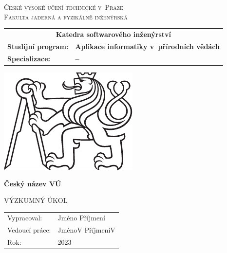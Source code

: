 \documentclass[a4paper,oneside,12pt]{book} %
\newcommand{\tb}{\textbf} %
\newcommand{\cvut}{České vysoké učení technické v~Praze}
\newcommand{\fjfi}{Fakulta jaderná a fyzikálně inženýrská}
\newcommand{\ksi}{Katedra softwarového inženýrství}
\newcommand{\program}{Aplikace informatiky v~přírodních vědách} %
\newcommand{\specializace}{--} %
\newcommand{\druh}{Výzkumný úkol} %
\newcommand{\woman}{} %
\newcommand{\logoCVUT}{\includegraphics{symbol_cvut_konturova_verze_cb.pdf}} %
\newcommand{\nazevcz}{Český název VÚ}    %
\newcommand{\autor}{Jméno Příjmení}   %
\newcommand{\vedouci}{JménoV PříjmeníV} %
\newcommand{\rok}{2023}  %
\newcommand{\kde}{Praze}
\newcommand{\prohlaseni}{Prohlašuji, že jsem svůj výzkumný úkol vypracoval\woman{} samostatně a použil\woman{} jsem pouze podklady (literaturu, projekty, SW atd.) uvedené v přiloženém seznamu.} %
\begin{document}
\thispagestyle{empty}

\begin{center}
    {\Large \textsc{\cvut}\\[1.5ex] \textsc{\fjfi}}\\
    \vspace{10mm}

    \begin{tabular}{ll}
		\multicolumn{2}{c}{\tb{\ksi}} \\[8pt]   
		\tb{Studijní program:} & \tb{\program}\\
		\tb{Specializace:} & \tb{\specializace}\\
    \end{tabular}

   \vspace{13mm} \logoCVUT \vspace{15mm} 

   {\huge \tb{\nazevcz}\par}
   \vspace{5mm}   
   
   \vspace{15mm}
   {\Large \MakeUppercase{\druh}}

   \vfill
   {\large
    \begin{tabular}{ll}
    Vypracoval: & \autor\\
    Vedoucí práce: & \vedouci\\
    Rok: & \rok
    \end{tabular}
   }
\end{center}

\thispagestyle{empty} %



\newpage %
\thispagestyle{empty}  %
\end{document}

